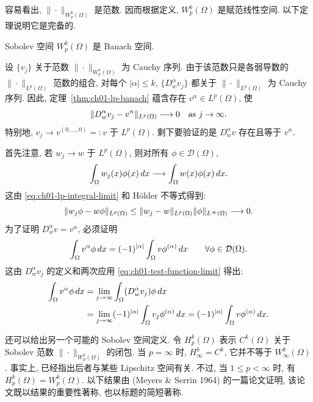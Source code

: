 容易看出, $\|\cdot\|_{W_p^k(\Omega)}$ 是范数. 因而根据定义, $W_p^k(\Omega)$ 是赋范线性空间. 以下定理说明它是完备的.

\begin{Theorem}
\label{thm:ch01-sobolev-banach}
Sobolev 空间 $W_p^k(\Omega)$ 是 Banach 空间.
\end{Theorem}

\begin{Proof}
设 $\{v_j\}$ 关于范数 $\|\cdot\|_{W_p^k(\Omega)}$ 为 Cauchy 序列. 由于该范数只是各弱导数的 $\|\cdot\|_{L^p(\Omega)}$ 范数的组合, 对每个 $|\alpha|\leq k$, $\{D_w^\alpha v_j\}$ 都关于 $\|\cdot\|_{L^p(\Omega)}$ 为 Cauchy 序列. 因此, 定理~\ref{thm:ch01-lp-banach} 蕴含存在 $v^\alpha\in L^p(\Omega)$, 使
\[
\MathBookFormulaID{formula-ch01-weak-derivative-sequence-limit}
\|D_w^\alpha v_j-v^\alpha\|_{L^p(\Omega)}\longrightarrow0
\quad\text{as }j\to\infty.
\]
特别地, $v_j\to v^{(0,\ldots,0)}=:v$ 于 $L^p(\Omega)$. 剩下要验证的是 $D_w^\alpha v$ 存在且等于 $v^\alpha$.

首先注意, 若 $w_j\to w$ 于 $L^p(\Omega)$, 则对所有 $\phi\in\mathcal D(\Omega)$,
\setcounter{equation}{2}
\begin{equation}
\MathBookFormulaID{formula-ch01-test-function-limit}
\int_\Omega w_j(x)\phi(x)\,dx\longrightarrow
\int_\Omega w(x)\phi(x)\,dx.
\label{eq:ch01-test-function-limit}
\end{equation}
这由 \eqref{eq:ch01-lp-integral-limit} 和 Hölder 不等式得到:
\[
\MathBookFormulaID{formula-ch01-test-function-holder-bound}
\|w_j\phi-w\phi\|_{L^p(\Omega)}
\leq\|w_j-w\|_{L^p(\Omega)}\|\phi\|_{L^\infty(\Omega)}\longrightarrow0.
\]
为了证明 $D_w^\alpha v=v^\alpha$, 必须证明
\[
\MathBookFormulaID{formula-ch01-limit-weak-derivative-goal}
\int_\Omega v^\alpha\phi\,dx
=(-1)^{|\alpha|}\int_\Omega v\phi^{(\alpha)}\,dx
\qquad\forall\phi\in\mathcal D(\Omega).
\]
这由 $D_w^\alpha v_j$ 的定义和两次应用 \eqref{eq:ch01-test-function-limit} 得出:
\[
\MathBookFormulaID{formula-ch01-limit-weak-derivative-proof}
\begin{aligned}
\int_\Omega v^\alpha\phi\,dx
&=\lim_{j\to\infty}\int_\Omega(D_w^\alpha v_j)\phi\,dx\\
&=\lim_{j\to\infty}(-1)^{|\alpha|}\int_\Omega v_j\phi^{(\alpha)}\,dx
=(-1)^{|\alpha|}\int_\Omega v\phi^{(\alpha)}\,dx.
\end{aligned}
\]
\end{Proof}

还可以给出另一个可能的 Sobolev 空间定义. 令 $H_p^k(\Omega)$ 表示 $C^k(\Omega)$ 关于 Sobolev 范数 $\|\cdot\|_{W_p^k(\Omega)}$ 的闭包. 当 $p=\infty$ 时, $H_\infty^k=C^k$, 它并不等于 $W_\infty^k(\Omega)$. 事实上, 已经指出后者与某些 Lipschitz 空间有关. 不过, 当 $1\leq p<\infty$ 时, 有 $H_p^k(\Omega)=W_p^k(\Omega)$. 以下结果由 (Meyers \& Serrin 1964) 的一篇论文证明, 该论文既以结果的重要性著称, 也以标题的简短著称.

